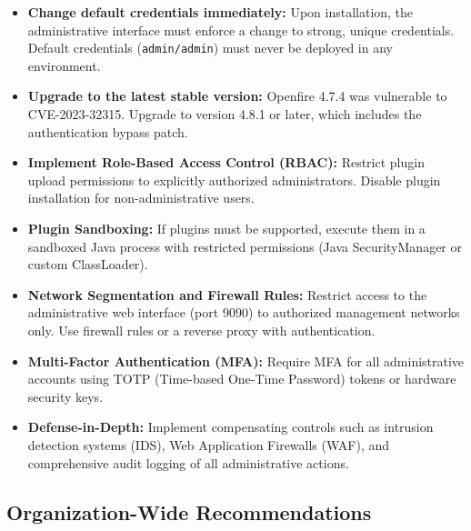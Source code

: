 \documentclass[11pt,a4paper]{article}
\begin{document}
\begin{itemize}
    \item \textbf{Change default credentials immediately:} Upon installation, the administrative interface must enforce a change to strong, unique credentials. Default credentials (\texttt{admin/admin}) must never be deployed in any environment.
    
    \item \textbf{Upgrade to the latest stable version:} Openfire 4.7.4 was vulnerable to CVE-2023-32315. Upgrade to version 4.8.1 or later, which includes the authentication bypass patch.
    
    \item \textbf{Implement Role-Based Access Control (RBAC):} Restrict plugin upload permissions to explicitly authorized administrators. Disable plugin installation for non-administrative users.
    
    \item \textbf{Plugin Sandboxing:} If plugins must be supported, execute them in a sandboxed Java process with restricted permissions (Java SecurityManager or custom ClassLoader).
    
    \item \textbf{Network Segmentation and Firewall Rules:} Restrict access to the administrative web interface (port 9090) to authorized management networks only. Use firewall rules or a reverse proxy with authentication.
    
    \item \textbf{Multi-Factor Authentication (MFA):} Require MFA for all administrative accounts using TOTP (Time-based One-Time Password) tokens or hardware security keys.
    
    \item \textbf{Defense-in-Depth:} Implement compensating controls such as intrusion detection systems (IDS), Web Application Firewalls (WAF), and comprehensive audit logging of all administrative actions.
\end{itemize}

\subsection{Organization-Wide Recommendations}
\end{document}
